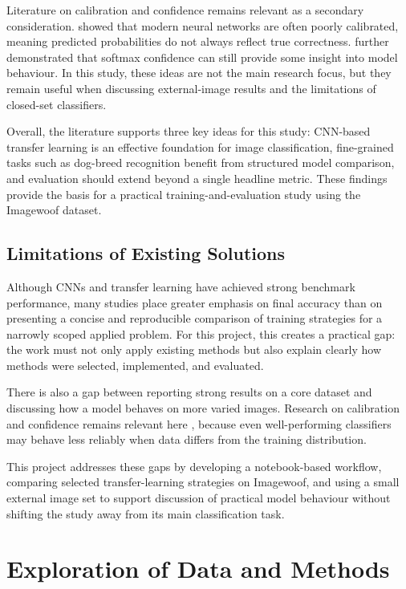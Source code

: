 \documentclass[12pt, a4paper]{article}
\begin{document}
Literature on calibration and confidence remains relevant as a secondary consideration. \citet{guo2017calibration} showed that modern neural networks are often poorly calibrated, meaning predicted probabilities do not always reflect true correctness. \citet{hendrycks2017baseline} further demonstrated that softmax confidence can still provide some insight into model behaviour. In this study, these ideas are not the main research focus, but they remain useful when discussing external-image results and the limitations of closed-set classifiers.

Overall, the literature supports three key ideas for this study: CNN-based transfer learning is an effective foundation for image classification, fine-grained tasks such as dog-breed recognition benefit from structured model comparison, and evaluation should extend beyond a single headline metric. These findings provide the basis for a practical training-and-evaluation study using the Imagewoof dataset.

\subsection{Limitations of Existing Solutions}

Although CNNs and transfer learning have achieved strong benchmark performance, many studies place greater emphasis on final accuracy than on presenting a concise and reproducible comparison of training strategies for a narrowly scoped applied problem. For this project, this creates a practical gap: the work must not only apply existing methods but also explain clearly how methods were selected, implemented, and evaluated.

There is also a gap between reporting strong results on a core dataset and discussing how a model behaves on more varied images. Research on calibration and confidence remains relevant here \citep{guo2017calibration, hendrycks2017baseline}, because even well-performing classifiers may behave less reliably when data differs from the training distribution.

This project addresses these gaps by developing a notebook-based workflow, comparing selected transfer-learning strategies on Imagewoof, and using a small external image set to support discussion of practical model behaviour without shifting the study away from its main classification task.

\section{Exploration of Data and Methods}
\end{document}
